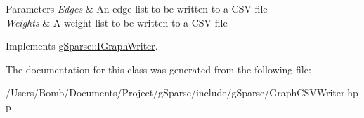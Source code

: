 \begin{DoxyParams}{Parameters}
{\em Edges} & An edge list to be written to a C\+SV file \\
\hline
{\em Weights} & A weight list to be written to a C\+SV file \\
\hline
\end{DoxyParams}


Implements \mbox{\hyperlink{classg_sparse_1_1_i_graph_writer_ae2c720f3e37629da40fdc5d0e4fe2dd2}{g\+Sparse\+::\+I\+Graph\+Writer}}.



The documentation for this class was generated from the following file\+:\begin{DoxyCompactItemize}
\item 
/\+Users/\+Bomb/\+Documents/\+Project/g\+Sparse/include/g\+Sparse/Graph\+C\+S\+V\+Writer.\+hpp\end{DoxyCompactItemize}
